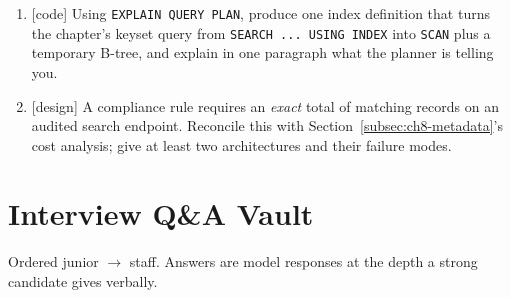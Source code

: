 \begin{enumerate}[label=\textbf{E8.\arabic*.}]
        headers, and the point at which you tell the consumer to use the
        GraphQL gateway (Chapter~12) instead.
  \item {[code]} Using \texttt{EXPLAIN QUERY PLAN}, produce one index
        definition that turns the chapter's keyset query from
        \texttt{SEARCH ... USING INDEX} into \texttt{SCAN} plus a temporary
        B-tree, and explain in one paragraph what the planner is telling
        you.
  \item {[design]} A compliance rule requires an \emph{exact} total of
        matching records on an audited search endpoint. Reconcile this with
        Section~\ref{subsec:ch8-metadata}'s cost analysis; give at least
        two architectures and their failure modes.
\end{enumerate}

\section{Interview Q\&A Vault}
\label{sec:ch8-interview-vault}

Ordered junior $\to$ staff. Answers are model responses at the depth a
strong candidate gives verbally.

